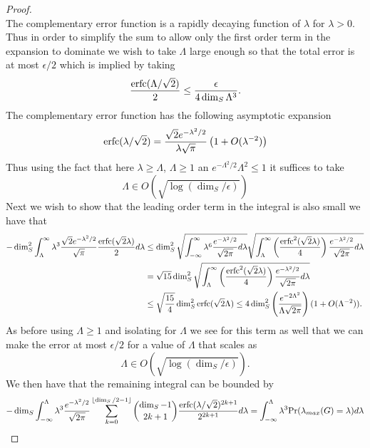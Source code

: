 \documentclass{article}
\begin{document}
\begin{proof}
\begin{equation}
\end{equation}
The complementary error function is a rapidly decaying function of $\lambda$ for $\lambda>0$.  Thus in order to simplify the sum to allow only the first order term in the expansion to dominate we wish to take $\Lambda$ large enough so that the total error is at most $\epsilon/2$ which is implied by taking
\begin{equation}
    \frac{{\rm erfc}(\Lambda/\sqrt{2})}{2} \le \frac{\epsilon}{4\dim_S \Lambda^3}.
\end{equation}
The complementary error function has the following asymptotic expansion
\begin{equation}
    {\rm erfc}(\lambda/\sqrt{2}) = \frac{\sqrt{2}e^{-\lambda^2/2}}{\lambda \sqrt{\pi}}\left( 1 + O(\lambda^{-2}) \right)
\end{equation}
Thus using the fact that here $\lambda\ge \Lambda$, $\Lambda \ge 1$ an $e^{-\Lambda^2/2}\Lambda^2 \le 1$ it suffices to take
\begin{equation}
    \Lambda \in O\left(\sqrt{\log(\dim_S/\epsilon)} \right)
\end{equation}
Next we wish to show that the leading order term in the integral is also small we have that
\begin{align}
    -\dim_S^2\int_{\Lambda}^{\infty}  \lambda^3 \frac{\sqrt{2}e^{-\lambda^2/2}}{\sqrt{\pi}} \frac{{\rm erfc}(\sqrt{2}\lambda)}{2} d\lambda&\le \dim_S^2\sqrt{\int_{-\infty}^\infty \lambda^6 \frac{e^{-\lambda^2/2}}{\sqrt{2\pi}}  d\lambda}\sqrt{\int_\Lambda^\infty\left(\frac{{\rm erfc}^2(\sqrt{2}\lambda)}{4}\right)\frac{e^{-\lambda^2/2}}{\sqrt{2\pi}}  d\lambda }\nonumber\\
    &=\sqrt{15} \dim_S^2 \sqrt{\int_\Lambda^\infty\left(\frac{{\rm erfc}^2(\sqrt{2}\lambda)}{4}\right)\frac{e^{-\lambda^2/2}}{\sqrt{2\pi}}  d\lambda }\nonumber\\
    &\le \sqrt{\frac{15}{4}} \dim_S^2 {\rm erfc}(\sqrt{2}\Lambda) \le 4 \dim_S^2 \left(\frac{e^{-2\Lambda^2}}{\Lambda \sqrt{2\pi}} \right) (1+O(\Lambda^{-2})).
\end{align}
As before using $\Lambda \ge 1$ and isolating for $\Lambda$ we see for this term as well that we can make the error at most $\epsilon/2$ for a value of $\Lambda$ that scales as
\begin{equation}
    \Lambda \in O\left(\sqrt{\log(\dim_S/\epsilon)} \right).
\end{equation}
We then have that the remaining integral can be bounded by
\begin{align}
    -\dim_S\int_{-\infty}^{\Lambda}  \lambda^3 \frac{e^{-\lambda^2/2}}{\sqrt{2\pi}} \sum_{k=0}^{\lfloor \dim_S/2-1\rfloor} \binom{\dim_S-1}{2k+1}\frac{{\rm erfc}(\lambda/\sqrt{2})^{2k+1}}{2^{2k+1}} d\lambda&=  \int_{-\infty}^\Lambda \lambda^3 {\rm Pr}(\lambda_{max}(G) = \lambda) d\lambda \nonumber\\

\end{align}
\end{proof}
\end{document}

